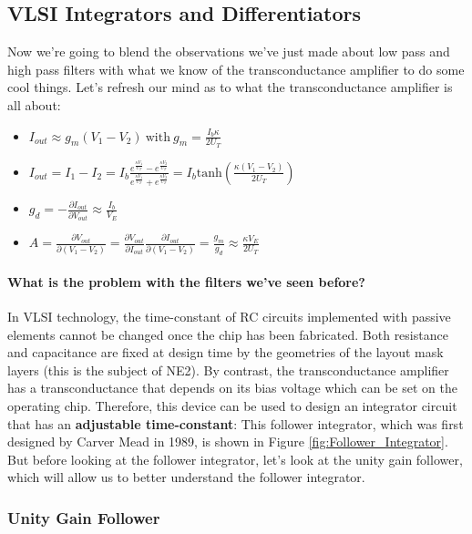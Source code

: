 \subsection{VLSI Integrators and Differentiators}

Now we're going to blend the observations we've just made about low pass and high pass filters with what we know of the transconductance amplifier to do some cool things. Let's refresh our mind as to what the transconductance amplifier is all about: 

\begin{itemize}
    \item $I_{out} \approx g_m(V_1 - V_2) \ \mathrm{with} \ g_m = \frac{I_b \kappa}{2 U_T}$
    \item $I_{out} = I_1 - I_2 = I_b\frac{e^{\frac{\kappa V_1}{U_T}} - e^{\frac{\kappa V_2}{U_T}}}{e^{\frac{\kappa V_1}{U_T}} + e^{\frac{\kappa V_2}{U_T}}} = I_b \mathrm{tanh}(\frac{\kappa (V_1 - V_2)}{2U_T})$
    \item $g_d = - \frac{\partial I_{out}}{\partial V_{out}} \approx \frac{I_b}{V_E}$
    \item $A = \frac{\partial{V_{out}}}{\partial{(V_1 - V_2)}} = \frac{\partial {V_{out}}}{\partial{I_{out}}} \frac{\partial {I_{out}}}{\partial{(V_1 - V_2)}} = \frac{g_m}{g_d} \approx \frac{\kappa V_E}{2U_T}$
\end{itemize}

\paragraph{What is the problem with the filters we've seen before?}
In VLSI technology, the time-constant of RC circuits implemented with passive elements cannot be changed once the chip has been fabricated. Both resistance and capacitance are fixed at design time by the geometries of the layout mask layers (this is the subject of NE2). By contrast, the transconductance amplifier has a transconductance that depends on its bias voltage
which can be set on the operating chip. Therefore, this device can be used to design an integrator circuit that has an \textbf{adjustable time-constant}: This follower integrator, which was first designed by Carver Mead in 1989, is shown in Figure \ref{fig:Follower_Integrator}. But before looking at the follower integrator, let's look at the unity gain follower, which will allow us to better understand the follower integrator. 

\subsubsection{Unity Gain Follower} 

